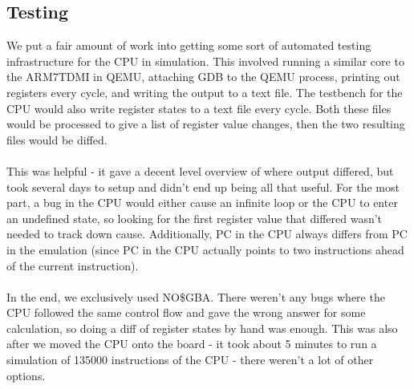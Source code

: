 \documentclass[11pt,a4paper]{article}
\begin{document}
	\subsection{Testing}
	We put a fair amount of work into getting some sort of automated testing infrastructure for the CPU in simulation. This involved running a similar core to the ARM7TDMI in QEMU, attaching GDB to the QEMU process, printing out registers every cycle, and writing the output to a text file. The testbench for the CPU would also write register states to a text file every cycle. Both these files would be processed to give a list of register value changes, then the two resulting files would be diffed. \\\\
	This was helpful - it gave a decent level overview of where output differed, but took several days to setup and didn't end up being all that useful. For the most part, a bug in the CPU would either cause an infinite loop or the CPU to enter an undefined state, so looking for the first register value that differed wasn't needed to track down cause. Additionally, PC in the CPU always differs from PC in the emulation (since PC in the CPU actually points to two instructions ahead of the current instruction).\\\\
	In the end, we exclusively used NO\$GBA. There weren't any bugs where the CPU followed the same control flow and gave the wrong answer for some calculation, so doing a diff of register states by hand was enough. This was also after we moved the CPU onto the board - it took about 5 minutes to run a simulation of 135000 instructions of the CPU - there weren't a lot of other options.
	
\end{document}
